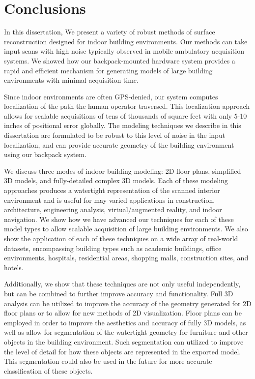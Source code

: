 \documentclass[12pt,onecolumn,oneside]{book}
\begin{document}

\chapter{Conclusions}
\label{ch:conclusion}

In this dissertation, We present a variety of robust methods of surface reconstruction designed for indoor building environments.  Our methods can take input scans with high noise typically observed in mobile ambulatory acquisition systems.  We showed how our backpack-mounted hardware system provides a rapid and efficient mechanism for generating models of large building environments with minimal acquisition time.

Since indoor environments are often GPS-denied, our system computes localization of the path the human operator traversed.  This localization approach allows for scalable acquisitions of tens of thousands of square feet with only 5-10 inches of positional error globally.  The modeling techniques we describe in this dissertation are formulated to be robust to this level of noise in the input localization, and can provide accurate geometry of the building environment using our backpack system.

We discuss three modes of indoor building modeling:  2D floor plans, simplified 3D models, and fully-detailed complex 3D models.  Each of these modeling approaches produces a watertight representation of the scanned interior environment and is useful for may varied applications in construction, architecture, engineering analysis, virtual/augmented reality, and indoor navigation.  We show how we have advanced our techniques for each of these model types to allow scalable acquisition of large building environments.  We also show the application of each of these techniques on a wide array of real-world datasets, encompassing building types such as academic buildings, office environments, hospitals, residential areas, shopping malls, construction sites, and hotels.

Additionally, we show that these techniques are not only useful independently, but can be combined to further improve accuracy and functionality.  Full 3D analysis can be utilized to improve the accuracy of the geometry generated for 2D floor plans or to allow for new methods of 2D visualization.  Floor plans can be employed in order to improve the aesthetics and accuracy of fully 3D models, as well as allow for segmentation of the watertight geometry for furniture and other objects in the building environment.  Such segmentation can utilized to improve the level of detail for how these objects are represented in the exported model.  This segmentation could also be used in the future for more accurate classification of these objects.  
\end{document}
